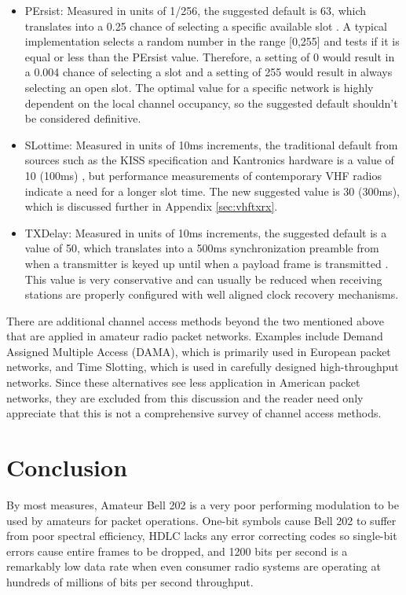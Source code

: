 \begin{itemize}
	\item PErsist: Measured in units of 1/256, the suggested default is
		63, which translates into a 0.25 chance of selecting a specific available
		slot \cite{KISSspec}. 
		A typical implementation selects a random number in the range
		[0,255] and tests if it is equal or less than the PErsist value.
		Therefore, a setting of 0 would result in a 0.004 chance of selecting 
		a slot and a setting of 255 would result in always selecting an open slot.
		The optimal value for a specific network is highly dependent on the
		local channel occupancy, so the suggested default shouldn't
		be considered definitive.
	\item SLottime: Measured in units of 10ms increments, the traditional
		default from sources such as the KISS specification and 
		Kantronics hardware 
		is a value of 10 (100ms) \cite{KISSspec}\cite{kamplusref}, 
		but performance measurements of contemporary VHF radios 
		indicate a need for a longer slot time. 
		The new suggested value is 30 (300ms), which is discussed further
		in Appendix \ref{sec:vhftxrx}.
	\item TXDelay: Measured in units of 10ms increments, the suggested
		default is a value of 50, which translates into a 500ms synchronization
		preamble from when a transmitter is keyed up until when a payload
		frame is transmitted \cite{KISSspec}.
		This value is very conservative and can usually be reduced when
		receiving stations are properly configured with
		well aligned clock recovery mechanisms.
\end{itemize}

There are additional channel access methods beyond the two mentioned above
that are applied in amateur radio packet networks. 
Examples include Demand Assigned Multiple Access (DAMA),
which is primarily used in European packet networks,
and Time Slotting, which is used in carefully designed high-throughput networks.
Since these alternatives see less application in American packet networks,
they are excluded from this discussion and the reader need only appreciate that
this is not a comprehensive survey of channel access methods.

\section{Conclusion}


By most measures, Amateur Bell 202 is a very poor performing modulation to
be used by amateurs for packet operations. 
One-bit symbols cause Bell 202 to suffer from poor spectral efficiency,
HDLC lacks any error correcting codes so single-bit errors cause entire 
frames to be dropped, and 1200 bits per second is a remarkably low
data rate when even consumer radio systems are operating at hundreds of millions
of bits per second throughput.

